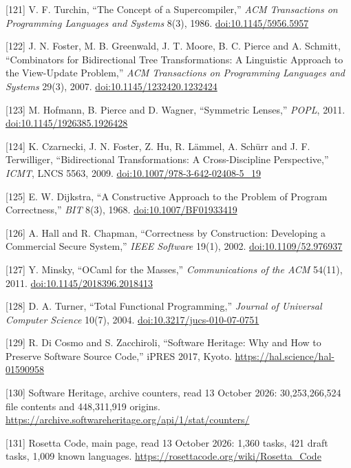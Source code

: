 \documentclass[10pt,letterpaper]{article}
\begin{document}
{[}121{]} V. F. Turchin, ``The Concept of a Supercompiler,'' \emph{ACM
Transactions on Programming Languages and Systems} 8(3), 1986.
\href{https://doi.org/10.1145/5956.5957}{doi:10.1145/5956.5957}

{[}122{]} J. N. Foster, M. B. Greenwald, J. T. Moore, B. C. Pierce and
A. Schmitt, ``Combinators for Bidirectional Tree Transformations: A
Linguistic Approach to the View-Update Problem,'' \emph{ACM Transactions
on Programming Languages and Systems} 29(3), 2007.
\href{https://doi.org/10.1145/1232420.1232424}{doi:10.1145/1232420.1232424}

{[}123{]} M. Hofmann, B. Pierce and D. Wagner, ``Symmetric Lenses,''
\emph{POPL}, 2011.
\href{https://doi.org/10.1145/1926385.1926428}{doi:10.1145/1926385.1926428}

{[}124{]} K. Czarnecki, J. N. Foster, Z. Hu, R. Lämmel, A. Schürr and J.
F. Terwilliger, ``Bidirectional Transformations: A Cross-Discipline
Perspective,'' \emph{ICMT}, LNCS 5563, 2009.
\href{https://doi.org/10.1007/978-3-642-02408-5_19}{doi:10.1007/978-3-642-02408-5\_19}

{[}125{]} E. W. Dijkstra, ``A Constructive Approach to the Problem of
Program Correctness,'' \emph{BIT} 8(3), 1968.
\href{https://doi.org/10.1007/BF01933419}{doi:10.1007/BF01933419}

{[}126{]} A. Hall and R. Chapman, ``Correctness by Construction:
Developing a Commercial Secure System,'' \emph{IEEE Software} 19(1),
2002. \href{https://doi.org/10.1109/52.976937}{doi:10.1109/52.976937}

{[}127{]} Y. Minsky, ``OCaml for the Masses,'' \emph{Communications of
the ACM} 54(11), 2011.
\href{https://doi.org/10.1145/2018396.2018413}{doi:10.1145/2018396.2018413}

{[}128{]} D. A. Turner, ``Total Functional Programming,'' \emph{Journal
of Universal Computer Science} 10(7), 2004.
\href{https://doi.org/10.3217/jucs-010-07-0751}{doi:10.3217/jucs-010-07-0751}

{[}129{]} R. Di Cosmo and S. Zacchiroli, ``Software Heritage: Why and
How to Preserve Software Source Code,'' iPRES 2017, Kyoto.
\url{https://hal.science/hal-01590958}

{[}130{]} Software Heritage, archive counters, read 13 October 2026:
30,253,266,524 file contents and 448,311,919 origins.
\url{https://archive.softwareheritage.org/api/1/stat/counters/}

{[}131{]} Rosetta Code, main page, read 13 October 2026: 1,360 tasks,
421 draft tasks, 1,009 known languages.
\url{https://rosettacode.org/wiki/Rosetta_Code}
\end{document}
